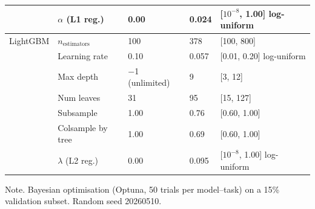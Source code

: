 \begin{table}[htp]
{\begin{tabular}{@{}lllll@{}}
 & $\alpha$ (L1 reg.) & 0.00 & 0.024 & [$10^{-8}$, 1.00] log-uniform \\
\midrule
LightGBM & $n_{\text{estimators}}$ & 100 & 378 & [100, 800] \\
 & Learning rate & 0.10 & 0.057 & [0.01, 0.20] log-uniform \\
 & Max depth & $-$1 (unlimited) & 9 & [3, 12] \\
 & Num leaves & 31 & 95 & [15, 127] \\
 & Subsample & 1.00 & 0.76 & [0.60, 1.00] \\
 & Colsample by tree & 1.00 & 0.69 & [0.60, 1.00] \\
 & $\lambda$ (L2 reg.) & 0.00 & 0.095 & [$10^{-8}$, 1.00] log-uniform \\
\bottomrule
\end{tabular}%
}
\begin{tablenotes}
\item Note. Bayesian optimisation (Optuna, 50 trials per model--task) on a 15\% validation subset. Random seed 20260510.
\end{tablenotes}
\end{table}
